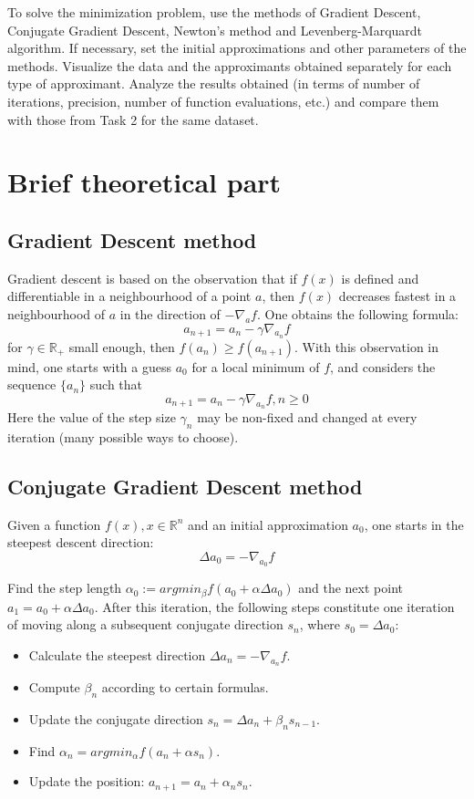 \documentclass[a4paper,article,14pt]{extarticle}
\begin{document}
	To solve the minimization problem, use the methods of Gradient Descent, Conjugate Gradient Descent, Newton’s method and Levenberg-Marquardt algorithm. If necessary, set the initial approximations and other parameters of the methods. Visualize the data and the approximants obtained separately for each type of approximant. Analyze the results obtained (in terms of number of iterations, precision, number of function evaluations, etc.) and compare them with those from Task 2 for the same dataset.
	
	\section{Brief theoretical part}
	\subsection{Gradient Descent method}
	Gradient descent is based on the observation that if $f(x)$ is defined and differentiable in a neighbourhood of a point $a$, then $f(x)$ decreases fastest in a neighbourhood of $a$ in the direction of $-\nabla_{a}f$. One obtains the following formula: $$a_{n+1}=a_n - \gamma\nabla_{a_n}f$$ for $\gamma\in\mathbb{R}_+$ small enough, then $f(a_n) \geq f(a_{n+1})$. With this observation in mind, one starts with a guess $a_0$ for a local minimum of $f$, and considers the sequence $\{a_n\}$ such that $$a_{n+1}=a_n - \gamma\nabla_{a_n}f, n \geq 0$$
	Here the value of the step size $\gamma_n$ may be non-fixed and changed at every iteration (many possible ways to choose).
	
	\subsection{Conjugate Gradient Descent method}
	
	Given a function $f(x), x\in \mathbb{R}^n$ and an initial approximation $a_0$, one starts in the steepest descent direction: $$\Delta a_0=-\nabla_{a_0}f$$
	
	Find the step length $\alpha_0 := argmin_\beta f(a_0 +\alpha\Delta a_0)$ and the next point $a_1 = a_0 + \alpha\Delta a_0$. After this iteration, the following steps constitute one iteration of moving along a subsequent conjugate direction $s_n$, where $s_0 = \Delta a_0$:
	\begin{itemize}
		\item Calculate the steepest direction $\Delta a_n = -\nabla_{a_n}f$.
		\item Compute $\beta_n$ according to certain formulas.
		\item Update the conjugate direction $s_n = \Delta a_n + \beta_n s_{n-1}$.
		\item Find $\alpha_n = argmin_\alpha f(a_n + \alpha s_n)$.
		\item Update the position: $a_{n+1} = a_n + \alpha_n s_n$.
	\end{itemize}
\end{document}
